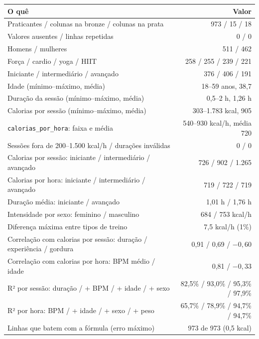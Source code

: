 \documentclass[12pt,a4paper]{article}
\begin{document}
\begin{center}
\small
\begin{tabularx}{\linewidth}{@{}X r@{}}
\toprule
\textbf{O quê} & \textbf{Valor}\\
\midrule
Praticantes / colunas na bronze / colunas na prata & 973 / 15 / 18\\
Valores ausentes / linhas repetidas & 0 / 0\\
Homens / mulheres & 511 / 462\\
Força / cardio / yoga / HIIT & 258 / 255 / 239 / 221\\
Iniciante / intermediário / avançado & 376 / 406 / 191\\
Idade (mínimo–máximo, média) & 18–59 anos, 38,7\\
Duração da sessão (mínimo–máximo, média) & 0,5–2 h, 1,26 h\\
Calorias por sessão (mínimo–máximo, média) & 303–1.783 kcal, 905\\
\midrule
\texttt{calorias\_por\_hora}: faixa e média & 540–930 kcal/h, média 720\\
Sessões fora de 200–1.500 kcal/h / durações inválidas & 0 / 0\\
Calorias por sessão: iniciante / intermediário / avançado & 726 / 902 / 1.265\\
Calorias por hora: iniciante / intermediário / avançado & 719 / 722 / 719\\
Duração média: iniciante / avançado & 1,01 h / 1,76 h\\
Intensidade por sexo: feminino / masculino & 684 / 753 kcal/h\\
Diferença máxima entre tipos de treino & 7,5 kcal/h (1\%)\\
\midrule
Correlação com calorias por sessão: duração / experiência / gordura & 0,91 / 0,69 / $-0{,}60$\\
Correlação com calorias por hora: BPM médio / idade & 0,81 / $-0{,}33$\\
R² por sessão: duração / + BPM / + idade / + sexo & 82,5\% / 93,0\% / 95,3\% / 97,9\%\\
R² por hora: BPM / + idade / + sexo / + peso & 65,7\% / 78,9\% / 94,7\% / 94,7\%\\
Linhas que batem com a fórmula (erro máximo) & 973 de 973 (0,5 kcal)\\
\bottomrule
\end{tabularx}
\end{center}
\end{document}
